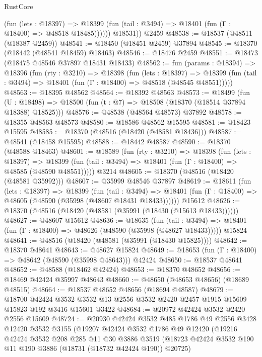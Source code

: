 \begin{lexlean}{RustCore}
\begin{coremodule}
              (fun (lets : @18397) =>
              @18399 (fun (tail : @3494) => @18401 (fun (Γ : @18400) => @48518 @18485))))))
        @18531))
    @2459
@48538 := @18537 (@48511 (@18387 @2459))
@48541 := @18450 (@18451 @2459) @37894
@48545 := @18370 (@18442 (@48541 @18459) @18463)
@48546 := @18476 @2459
@48551 := @18473 (@18475 @48546 @37897 @18431 @18433)
@48562 := fun (params : @18394) =>
  @18396
    (fun (rty : @3210) =>
    @18398
      (fun (lets : @18397) =>
      @18399 (fun (tail : @3494) => @18401 (fun (Γ : @18400) => @48518 (@48545 @48551)))))
@48563 := @18395 @48562
@48564 := @18392 @48563
@48573 := @18499
    (fun (U : @18498) => @18500 (fun (t : @7) => @18508 (@18370 (@18514 @37894 @18388) @18525)))
@48576 := @48538 (@48564 @48573) @37892
@48578 := @18355 @48563 @48573
@48580 := @18586 @48562 @15595
@48581 := @18423 @15595
@48585 := @18370 (@48516 (@18420 (@48581 @18436)))
@48587 := @48541 (@18458 @15595)
@48588 := @18442 @48587
@48590 := @18370 (@48588 @18463)
@48601 := @18589
    (fun (rty : @3210) =>
    @18398
      (fun (lets : @18397) =>
      @18399 (fun (tail : @3494) => @18401 (fun (Γ : @18400) => @48585 (@48590 @48551)))))
    @3214
@48605 := @18370 (@48516 (@18420 (@48581 @35992)))
@48607 := @35999 @48546 @37897
@48619 := @18611
    (fun (lets : @18397) =>
    @18399
      (fun (tail : @3494) =>
      @18401 (fun (Γ : @18400) => @48605 (@48590 (@35998 (@48607 @18431 @18433))))))
    @15612
@48626 := @18370 (@48516 (@18420 (@48581 (@35991 (@18430 (@15613 @18433))))))
@48627 := @48607 @15612
@48636 := @18635
    (fun (tail : @3494) => @18401 (fun (Γ : @18400) => @48626 (@48590 (@35998 (@48627 @18433)))))
    @15824
@48641 := @48516 (@18420 (@48581 (@35991 (@18430 @15825))))
@48642 := @18370 @48641
@48643 := @48627 @15824
@48649 := @18653 (fun (Γ : @18400) => @48642 (@48590 (@35998 @48643))) @42424
@48650 := @18537 @48641
@48652 := @48588 (@18462 @42424)
@48653 := @18370 @48652
@48656 := @18469 @42424 @35997 @48643
@48660 := @48650 (@48653 @48656) (@18689 @48515)
@48664 := @18537 @48652 @48656 (@18694 @48587)
@48679 := @18700
    @42424
    @3532
    @3532
    @13
    @2556
    @3532
    @2420
    @2457
    @1915
    @15609
    @15823
    @192
    @3416
    @15601
    @3422
@48684 := @20972 @42424 @3532 @2420 @2556 @15609
@48724 := @20930
    @42424
    @3532
    @485
    @1786
    @49
    @2556
    @3428
    @12420
    @3532
    @3155
    (@19207
      @42424
      @3532
      @1786
      @49
      @12420
      (@19216
        @42424
        @3532
        @208
        @285
        @11
        @30
        @3886
        @3519
        (@18723 @42424 @3532 @190 @11 @190 @3886 (@18731 (@18732 @42424 @190)) @20725)

\end{coremodule}
\end{lexlean}
